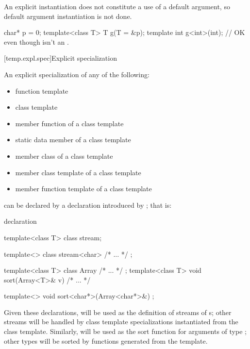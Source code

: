 \pnum
An explicit instantiation does not constitute a use of a default argument,
so default argument instantiation is not done.
\enterexample

\begin{codeblock}
char* p = 0;
template<class T> T g(T = &p);
template int g<int>(int);       // OK even though  isn't an .
\end{codeblock}
\exitexampleb

[temp.expl.spec]{Explicit specialization}

\pnum
{}%
An explicit specialization of any of the following:

\begin{itemize}
\item
function template
\item
class template
\item
member function of a class template
\item
static data member of a class template
\item
member class of a class template
\item
member class template of a class template
\item
member function template of a class template
\end{itemize}

can be declared by a declaration introduced by
;
that is:
%

\begin{bnf}
\br
   declaration
\end{bnf}

\enterexample
\begin{codeblock}
template<class T> class stream;

template<> class stream<char> { /* ... */ };

template<class T> class Array { /* ... */ };
template<class T> void sort(Array<T>& v) { /* ... */ }

template<> void sort<char*>(Array<char*>&) ;
\end{codeblock}

Given these declarations,
will be used as the definition of streams of
s;
other streams will be handled by class template specializations instantiated
from the class template.
Similarly,
will be used as the sort function for arguments
of type
;
other
types will be sorted by functions generated from the template.
\exitexample

